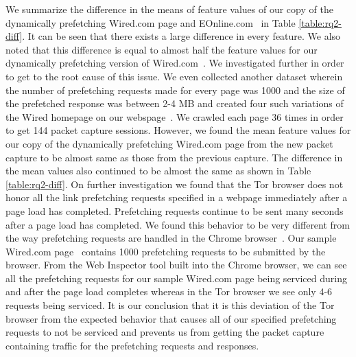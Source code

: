 We summarize the difference in the means of feature values of our copy of the dynamically prefetching Wired.com page and EOnline.com~\cite{eonline} in Table \ref{table:rq2-diff}. It can be seen that there exists a large difference in every feature. 
We also noted that this difference is equal to almost half the feature values for our dynamically prefetching version of Wired.com~\cite{tj-wired}. 
We investigated further in order to get to the root cause of this issue. 
We even collected another dataset wherein the number of prefetching requests made for every page was 1000 and the size of the prefetched response was between 2-4 MB and created four such variations of the Wired homepage on our webspage~\cite{tj-wired}. 
We crawled each page 36 times in order to get 144 packet capture sessions.
However, we found the mean feature values for our copy of the dynamically prefetching Wired.com page from the new packet capture to be almost same as those from the previous capture. 
The difference in the mean values also continued to be almost the same as shown in Table \ref{table:rq2-diff}.
On further investigation we found that the Tor browser does not honor all the link prefetching requests specified in a webpage immediately after a page load has completed. 
Prefetching requests continue to be sent many seconds after a page load has completed. 
We found this behavior to be very different from the way prefetching requests are handled in the Chrome browser~\cite{chrome}. 
Our sample Wired.com page~\cite{tj-wired} contains 1000 prefetching requests to be submitted by the browser.
From the Web Inspector tool built into the Chrome browser, we can see all the prefetching requests for our sample Wired.com page being serviced during and after the page load completes whereas in the Tor browser we see only 4-6 requests being serviced.
It is our conclusion that it is this deviation of the Tor browser from the expected behavior that causes all of our specified prefetching requests to not be serviced and prevents us from getting the packet capture containing traffic for the prefetching requests and responses.  



